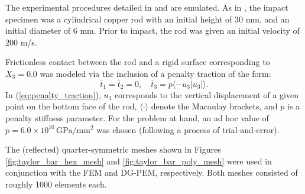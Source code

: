 The experimental procedures detailed in \cite{Johnson&Cook:83} and \cite{Gust:82} are emulated. As in \cite{Johnson&Cook:83}, the impact specimen was a cylindrical copper rod with an initial height of 30 mm, and an initial diameter of 6 mm. Prior to impact, the rod was given an initial velocity of $200$ m/s.

Frictionless contact between the rod and a rigid surface corresponding to $X_3 = 0.0$ was modeled via the inclusion of a penalty traction of the form:
\begin{equation}
	\bar{t}_1 = \bar{t}_2 = 0, \quad \bar{t}_3 = p \langle -u_3|u_3|  \rangle.
	\label{eq:penalty_traction}
\end{equation}
In (\ref{eq:penalty_traction}), $u_3$ corresponds to the vertical displacement of a given point on the bottom face of the rod, $\langle \cdot \rangle$ denote the Macaulay brackets, and $p$ is a penalty stiffness parameter. For the problem at hand, an ad hoc value of $p = 6.0 \times 10^{10} \, \text{GPa}/\text{mm}^2$ was chosen (following a process of trial-and-error).

The (reflected) quarter-symmetric meshes shown in Figures \ref{fig:taylor_bar_hex_mesh} and \ref{fig:taylor_bar_poly_mesh} were used in conjunction with the FEM and DG-PEM, respectively. Both meshes consisted of roughly 1000 elements each.

